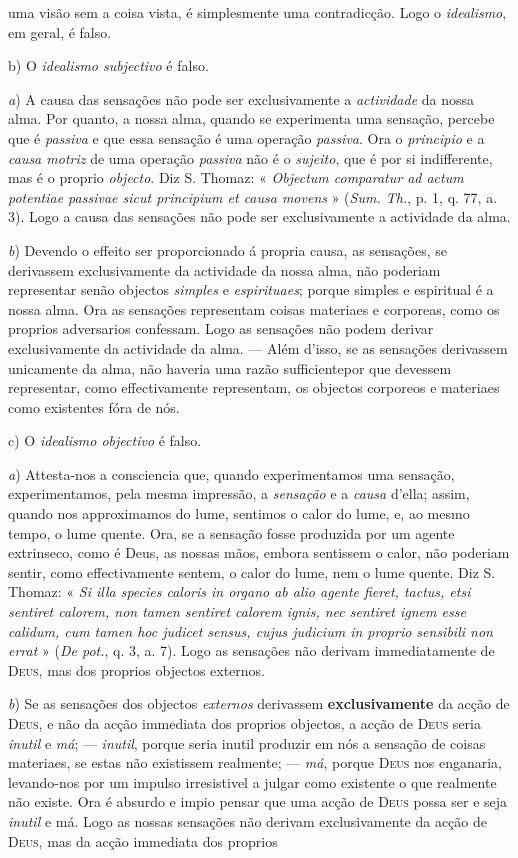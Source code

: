 uma visão sem a coisa vista, é simplesmente uma contradicção. Logo o \emph{idealismo}, em geral, é falso.\par b) O \emph{idealismo subjectivo} é falso.\par \emph{a}) A causa das sensações não pode ser exclusivamente a \emph{actividade} da nossa alma. Por quanto, a nossa alma, quando se experimenta uma sensação, percebe que é \emph{passiva} e que essa sensação é uma operação \emph{passiva}. Ora o \emph{principio} e a \emph{causa motriz} de uma operação \emph{passiva} não é o \emph{sujeito}, que é por si indifferente, mas é o proprio \emph{objecto}. Diz S. Thomaz: « \emph{Objectum comparatur ad actum potentiae passivae sicut principium et causa movens} » (\emph{Sum. Th.}, p. 1, q. 77, a. 3). Logo a causa das sensações não pode ser exclusivamente a actividade da alma.\par \emph{b}) Devendo o effeito ser proporcionado á propria causa, as sensações, se derivassem exclusivamente da actividade da nossa alma, não poderiam representar senão objectos \emph{simples} e \emph{espirituaes}; porque simples e espiritual é a nossa alma. Ora as sensações representam coisas materiaes e corporeas, como os proprios adversarios confessam. Logo as sensações não podem derivar exclusivamente da actividade da alma. --- Além d'isso, se as sensações derivassem unicamente da alma, não haveria uma razão sufficientepor que devessem representar, como effectivamente representam, os objectos corporeos e materiaes como existentes fóra de nós.\par c) O \emph{idealismo objectivo} é falso.\par \emph{a}) Attesta-nos a consciencia que, quando experimentamos uma sensação, experimentamos, pela mesma impressão, a \emph{sensação} e a \emph{causa} d'ella; assim, quando nos approximamos do lume, sentimos o calor do lume, e, ao mesmo tempo, o lume quente. Ora, se a sensação fosse produzida por um agente extrinseco, como é Deus, as nossas mãos, embora sentissem o calor, não poderiam sentir, como effectivamente sentem, o calor do lume, nem o lume quente. Diz S. Thomaz: « \emph{Si illa species caloris in organo ab alio agente fieret, tactus, etsi sentiret calorem, non tamen sentiret calorem ignis, nec sentiret ignem esse calidum, cum tamen hoc judicet sensus, cujus judicium in proprio sensibili non errat} » (\emph{De pot.}, q. 3, a. 7). Logo as sensações não derivam immediatamente de \textsc{Deus}, mas dos proprios objectos externos.\par \emph{b}) Se as sensações dos objectos \emph{externos} derivassem \textbf{exclusivamente} da acção de \textsc{Deus}, e não da acção immediata dos proprios objectos, a acção de \textsc{Deus} seria \emph{inutil} e \emph{má}; --- \emph{inutil}, porque seria inutil produzir em nós a sensação de coisas materiaes, se estas não existissem realmente; --- \emph{má}, porque \textsc{Deus} nos enganaria, levando-nos por um impulso irresistivel a julgar como existente o que realmente não existe. Ora é absurdo e impio pensar que uma acção de \textsc{Deus} possa ser e seja \emph{inutil} e má. Logo as nossas sensações não derivam exclusivamente da acção de \textsc{Deus}, mas da acção immediata dos proprios 